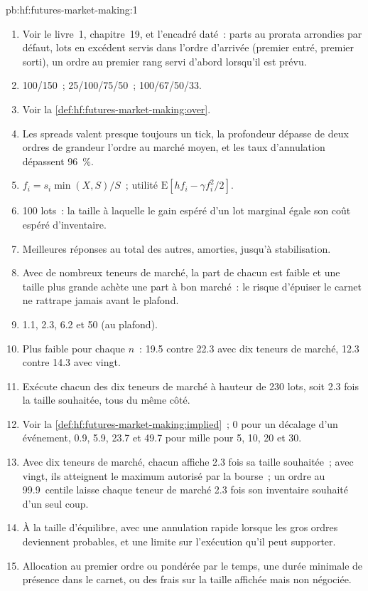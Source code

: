 \begin{solution}{pb:hf:futures-market-making:1}
\begin{enumerate}
\item Voir le livre~1, chapitre~19, et l'encadré daté~: parts au prorata arrondies par défaut, lots en excédent servis dans l'ordre d'arrivée (premier entré, premier sorti), un ordre au premier rang servi d'abord lorsqu'il est prévu.
\item 100/150~; 25/100/75/50~; 100/67/50/33.
\item Voir la \cref{def:hf:futures-market-making:over}.
\item Les spreads valent presque toujours un tick, la profondeur dépasse de deux ordres de grandeur l'ordre au marché moyen, et les taux d'annulation dépassent 96~\%.
\item $f_i=s_i\min(X,S)/S$~; utilité $\mathrm{E}[hf_i-\gamma f_i^2/2]$.
\item 100 lots~: la taille à laquelle le gain espéré d'un lot marginal égale son coût espéré d'inventaire.
\item Meilleures réponses au total des autres, amorties, jusqu'à stabilisation.
\item Avec de nombreux teneurs de marché, la part de chacun est faible et une taille plus grande achète une part à bon marché~: le risque d'épuiser le carnet ne rattrape jamais
avant le plafond.
\item 1.1, 2.3, 6.2 et 50 (au plafond).
\item Plus faible pour chaque $n$~: 19.5 contre 22.3 avec dix teneurs de marché, 12.3 contre 14.3 avec vingt.
\item Exécute chacun des dix teneurs de marché à hauteur de 230 lots, soit 2.3 fois la taille souhaitée, tous du même côté.
\item Voir la \cref{def:hf:futures-market-making:implied}~; 0 pour un décalage d'un événement, 0.9, 5.9, 23.7 et 49.7 pour mille pour 5, 10, 20 et 30.
\item Avec dix teneurs de marché, chacun affiche 2.3 fois sa taille souhaitée~; avec vingt, ils atteignent le maximum autorisé par la bourse~; un ordre au 99.9~centile laisse chaque teneur de marché
2.3 fois son inventaire souhaité d'un seul coup.
\item À la taille d'équilibre, avec une annulation rapide lorsque les gros ordres deviennent probables, et une limite sur l'exécution qu'il peut supporter.
\item Allocation au premier ordre ou pondérée par le temps, une durée minimale de présence dans le carnet, ou des frais sur la taille affichée mais non négociée.

\end{enumerate}
\end{solution}
